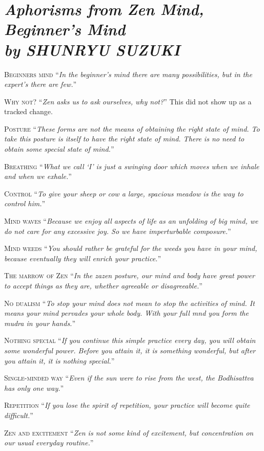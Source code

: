 \documentclass[14pt]{extarticle}
\newcommand{\aphor}[3]{
    \lettrine[lines=2, lraise=0.15]{#1}{#2}
    \enquote{\textit{#3}}
}
\begin{document}
\section*{\LARGE\sffamily\slshape Aphorisms from Zen Mind, Beginner's Mind \\ {\large by SHUNRYU SUZUKI }}
\aphor{B}{eginners mind} {In the beginner's mind there are many possibilities, but in the expert's there are few.}

\aphor{W}{hy not?} {Zen asks us to ask ourselves, why not?} This did not show up as a tracked change.


\aphor{P}{osture} {These forms are not the means of obtaining the right state of mind. To take this posture is itself to have the right state of mind. There is no need to obtain some special state of mind.}

\aphor{B}{reathing} {What we call \enquote{I} is just a swinging door which moves when we inhale and when we exhale.}

\aphor{C}{ontrol} {To give your sheep or cow a large, spacious meadow is the way to control him.}

\aphor{M}{ind waves} {Because we enjoy all aspects of life as an unfolding of big mind, we do not care for any excessive joy. So we have imperturbable composure.}

\aphor{M}{ind weeds} {You should rather be grateful for the weeds you have in your mind, because eventually they will enrich your practice.}


\aphor{T}{he marrow of Zen} {In the zazen posture, our mind and body have great power to accept things as they are, whether agreeable or disagreeable.}


\aphor{N}{o dualism} {To stop your mind does not mean to stop the activities of mind. It means your mind pervades your whole body. With your full mnd you form the mudra in your hands.}

\pagebreak

\aphor{N}{othing special} {If you continue this simple practice every day, you will obtain some wonderful power. Before you attain it, it is something wonderful, but after you attain it, it is nothing special.}

\aphor{S}{ingle-minded way} {Even if the sun were to rise from the west, the Bodhisattva has only one way.}

\aphor{R}{epetition} {If you lose the spirit of repetition, your practice will become quite difficult.}

\aphor{Z}{en and excitement} {Zen is not some kind of excitement, but concentration on our usual everyday routine.}
\end{document}
